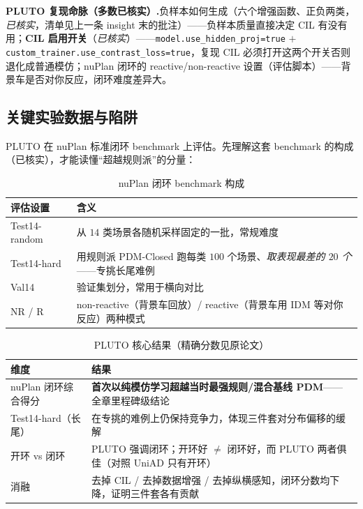 \begin{note}
\textbf{PLUTO 复现命脉（多数已核实）.}\;负样本如何生成（六个增强函数、正负两类，\emph{已核实}，清单见上一条 insight 末的批注）——负样本质量直接决定 CIL 有没有用；\textbf{CIL 启用开关}（\emph{已核实}）——\texttt{model.use\_hidden\_proj=true} $+$ \texttt{custom\_trainer.use\_contrast\_loss=true}，复现 CIL 必须打开这两个开关否则退化成普通模仿；nuPlan 闭环的 reactive/non-reactive 设置（评估脚本）——背景车是否对你反应，闭环难度差异大。
\end{note}

\subsection{关键实验数据与陷阱}
\label{sec:de-pluto-exp}

PLUTO 在 nuPlan 标准闭环 benchmark 上评估。先理解这套 benchmark 的构成（已核实），才能读懂“超越规则派”的分量：

\begin{table}[H]\centering\small
\caption{nuPlan 闭环 benchmark 构成}
\label{tab:de-nuplan-bench}
\begin{tabular}{p{} p{}}
\toprule
评估设置 & 含义 \\
\midrule
Test14-random & 从 $14$ 类场景各随机采样固定的一批，常规难度 \\
Test14-hard & 用规则派 PDM-Closed 跑每类 $100$ 个场景、\emph{取表现最差的 $20$ 个}——专挑长尾难例 \\
Val14 & 验证集划分，常用于横向对比 \\
NR / R & non-reactive（背景车回放）/ reactive（背景车用 IDM 等对你反应）两种模式 \\
\bottomrule
\end{tabular}
\end{table}

\begin{table}[H]\centering\small
\caption{PLUTO 核心结果（精确分数见原论文）}
\label{tab:de-pluto-metrics}
\begin{tabular}{p{} p{}}
\toprule
维度 & 结果 \\
\midrule
nuPlan 闭环综合得分 & \textbf{首次以纯模仿学习超越当时最强规则/混合基线 PDM}——全章里程碑级结论 \\
Test14-hard（长尾） & 在专挑的难例上仍保持竞争力，体现三件套对分布偏移的缓解 \\
开环 vs 闭环 & PLUTO 强调闭环；开环好 $\neq$ 闭环好，而 PLUTO 两者俱佳（对照 UniAD 只有开环） \\
消融 & 去掉 CIL / 去掉数据增强 / 去掉纵横感知，闭环分数均下降，证明三件套各有贡献 \\
\bottomrule
\end{tabular}
\end{table}

